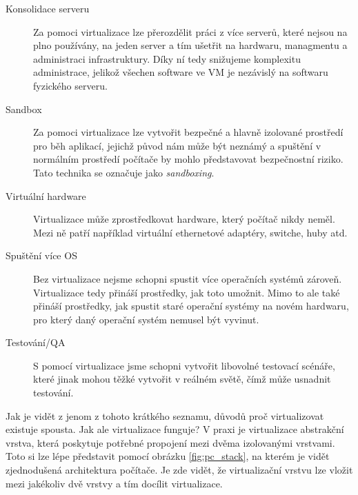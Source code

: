\begin{description}
    \item[Konsolidace serveru] Za pomoci virtualizace lze přerozdělit práci z více serverů, které nejsou na plno používány, na jeden server a tím ušetřit na hardwaru, managmentu a administraci infrastruktury. Díky ní tedy snižujeme komplexitu administrace, jelikož všechen software ve VM je nezávislý na softwaru fyzického serveru. 
    \item[Sandbox] Za pomoci virtualizace lze vytvořit bezpečné a hlavně izolované prostředí pro běh aplikací, jejichž původ nám může být neznámý a spuštění v normálním prostředí počítače by mohlo představovat bezpečnostní riziko. Tato technika se označuje jako \textit{sandboxing}.
    \item[Virtuální hardware] Virtualizace může zprostředkovat hardware, který počítač nikdy neměl. Mezi ně patří například virtuální ethernetové adaptéry, switche, huby atd.
    \item[Spuštění více OS] Bez virtualizace nejsme schopni spustit více operačních systémů zároveň. Virtualizace tedy přináší prostředky, jak toto umožnit. Mimo to ale také přináší prostředky, jak spustit staré operační systémy na novém hardwaru, pro který daný operační systém nemusel být vyvinut.
    \item[Testování/QA] S pomocí virtualizace jsme schopni vytvořit libovolné testovací scénáře, které jinak mohou těžké vytvořit v reálném světě, čímž může usnadnit testování. 
\end{description}

Jak je vidět z jenom z tohoto krátkého seznamu, důvodů proč virtualizovat existuje spousta. Jak ale virtualizace funguje? V praxi je virtualizace abstrakční vrstva, která poskytuje potřebné propojení mezi dvěma izolovanými vrstvami. Toto si lze lépe představit pomocí obrázku \ref{fig:pc_stack}, na kterém je vidět zjednodušená architektura počítače. Je zde vidět, že virtualizační vrstvu lze vložit mezi jakékoliv dvě vrstvy a tím docílit virtualizace. \cite{campbell2006introduction}\cite{chiueh2005survey}

